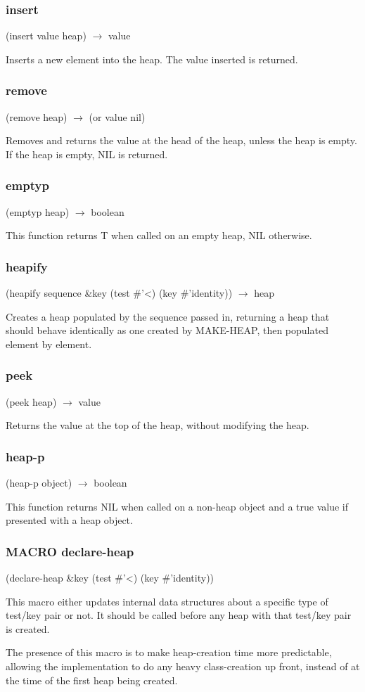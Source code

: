\documentclass{report}
\begin{document}
 \subsubsection{insert}
   (insert value heap) $\rightarrow$ value

 Inserts a new element into the heap. The value inserted is returned.

 \subsubsection{remove}
   (remove heap) $\rightarrow$ (or value nil)

 Removes and returns the value at the head of the heap, unless the
 heap is empty. If the heap is empty, NIL is returned.
 
 \subsubsection{emptyp}
   (emptyp heap) $\rightarrow$ boolean

 This function returns T when called on an empty heap, NIL otherwise.

 \subsubsection{heapify}
   (heapify sequence \&key (test \#'\textless) (key \#'identity)) $\rightarrow$ heap

 Creates a heap populated by the sequence passed in, returning a heap
 that should behave identically as one created by MAKE-HEAP, then
 populated element by element.

 \subsubsection{peek}
   (peek heap) $\rightarrow$ value

 Returns the value at the top of the heap, without modifying the heap.

 \subsubsection{heap-p}
   (heap-p object) $\rightarrow$ boolean

 This function returns NIL when called on a non-heap object and a true
 value if presented with a heap object.
 
 \subsubsection{MACRO declare-heap}
   (declare-heap \&key (test \#'<) (key \#'identity))

 This macro either updates internal data structures about a specific
 type of test/key pair or not. It should be called before any
 heap with that test/key pair is created.

 The presence of this macro is to make heap-creation time more
 predictable, allowing the implementation to do any heavy
 class-creation up front, instead of at the time of the first heap
 being created.
\end{document}
